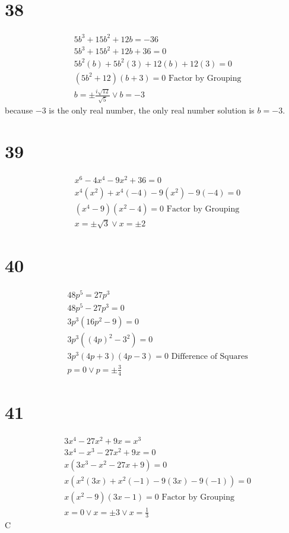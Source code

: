 \documentclass{article}
\theoremstyle{definition}
\begin{document}
\section*{38}
\[
\begin{array}{rl}
	& 5b^3+15b^2+12b=-36 \\
	& 5b^3+15b^2+12b+36=0 \\
	& 5b^2(b)+5b^2(3)+12(b)+12(3)=0 \\
	& (5b^2+12)(b+3)=0\textrm{ Factor by Grouping} \\
	& b=\pm\frac{i\sqrt{12}}{\sqrt{5}}\vee b=-3
\end{array}
\]
because $-3$ is the only real number, the only real number solution is $b=-3$.

\section*{39}
\[
\begin{array}{rl}
	& x^6-4x^4-9x^2+36=0 \\
	& x^4(x^2)+x^4(-4)-9(x^2)-9(-4)=0 \\
	& (x^4-9)(x^2-4)=0\textrm{ Factor by Grouping} \\
	& x=\pm\sqrt{3}\vee x=\pm 2
\end{array}
\]

\section*{40}
\[
\begin{array}{rl}
	& 48p^5=27p^3 \\
	& 48p^5-27p^3=0 \\
	& 3p^3(16p^2-9)=0 \\
	& 3p^3((4p)^2-3^2)=0 \\
	& 3p^3(4p+3)(4p-3)=0\textrm{ Difference of Squares} \\
	& p=0\vee p=\pm\frac{3}{4}
\end{array}
\]

\section*{41}
\[
\begin{array}{rl}
	& 3x^4-27x^2+9x=x^3 \\
	& 3x^4-x^3-27x^2+9x=0 \\
	& x(3x^3-x^2-27x+9)=0 \\
	& x(x^2(3x)+x^2(-1)-9(3x)-9(-1))=0 \\
	& x(x^2-9)(3x-1)=0\textrm{ Factor by Grouping} \\
	& x=0\vee x=\pm 3\vee x=\frac{1}{3}
\end{array}
\]
C
\end{document}
